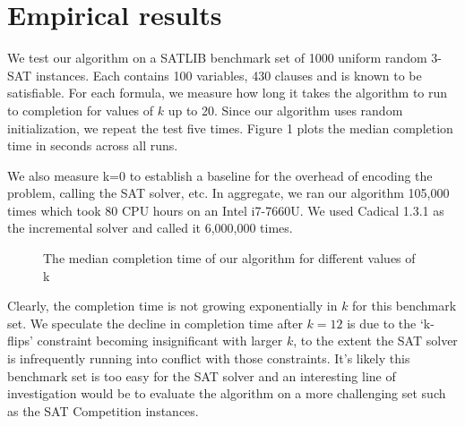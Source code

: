 \documentclass{article}
\begin{document}
\break

\section{Empirical results}

We test our algorithm on a SATLIB benchmark set of 1000 uniform random 3-SAT
instances\cite{satlibproblems}. Each contains 100 variables, 430 clauses and is
known to be satisfiable. For each formula, we measure how long it takes the
algorithm to run to completion for values of $k$ up to 20. Since our algorithm
uses random initialization, we repeat the test five times. Figure 1 plots the
median completion time in seconds across all runs.

We also measure k=0 to establish a baseline for the overhead of encoding the
problem, calling the SAT solver, etc. In aggregate, we ran our algorithm 105,000
times which took 80 CPU hours on an Intel i7-7660U. We used Cadical 1.3.1 as the
incremental solver\cite{biere2017cadical} and called it 6,000,000 times. \\

\begin{figure}[htp]
\caption{The median completion time of our algorithm for different values of k}
\end{figure}

\noindent Clearly, the completion time is not growing exponentially in $k$ for
this benchmark set. We speculate the decline in completion time after $k=12$ is
due to the ‘k-flips’ constraint becoming insignificant with larger $k$, to the
extent the SAT solver is infrequently running into conflict with those
constraints. It's likely this benchmark set is too easy for the SAT solver and
an interesting line of investigation would be to evaluate the algorithm on a
more challenging set such as the SAT Competition instances.
\end{document}
